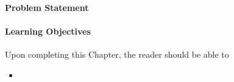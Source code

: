 
\paragraph{Problem Statement}
 

\paragraph{Learning Objectives}
Upon completing this Chapter, the reader should be able to
\begin{itemize}
  \item 
\end{itemize}